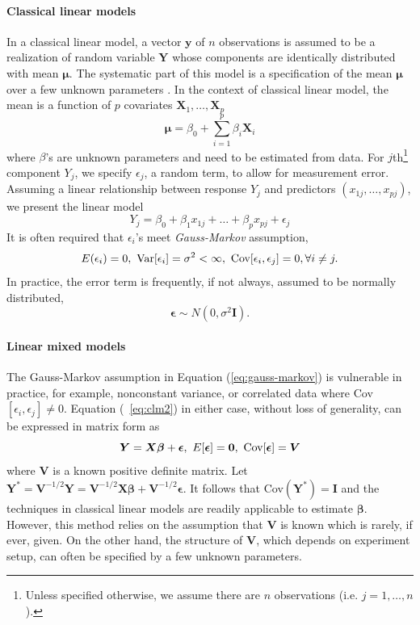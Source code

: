 \paragraph{Classical linear models}\label{para:clm}
In a classical linear model, a vector $\bm y$ of $n$ observations is assumed to be a realization
of random variable $\bm Y$ whose components are identically distributed with mean $\bm \mu$. The
systematic part of this model is a specification of the mean $\bm\mu$ over a few unknown parameters
\citep{mccullagh1989generalized}. In the context of classical linear model, the mean is a function
of $p$ covariates $\bm X_1, \ldots, \bm X_p$
\begin{equation}\label{eq:clm}
\bm \mu =\beta_0 + \sum_{i=1}^p\beta_i \bm X_i
\end{equation}	
where $\beta$'s are unknown parameters and need to be estimated from data. For
$j$th\footnote{Unless specified otherwise, we assume there are $n$ observations (i.e. $j=1, \ldots
	,n$).} component $Y_j$, we specify $\epsilon_j$, a random term, to allow for measurement error.
Assuming a linear relationship between response $Y_j$ and predictors $(x_{1j}, \ldots, x_{pj})$, we
present the linear model 
\begin{equation}\label{eq:clm2}
Y_j= \beta_0 + \beta_1x_{1j} + \ldots + \beta_p x_{pj} + \epsilon_j
\end{equation}
It is often required that $\epsilon_i$'s meet \textit{Gauss-Markov} assumption,
\begin{equation}\label{eq:gauss-markov}
E(\epsilon_i)=0,~ \text{Var}[\epsilon_i]=
\sigma^2<\infty, ~\text{Cov}[\epsilon_i, \epsilon_j]=0, \forall i \neq j.
\end{equation}
In practice, the error term is frequently, if not always, assumed to be normally distributed, 
\begin{equation}\label{eq:normalassumption}
\bm \epsilon \sim N(0, \sigma^2 \bm I).
\end{equation}

\paragraph{Linear mixed models}\label{para:lmm}
The Gauss-Markov assumption in Equation (\ref{eq:gauss-markov}) is vulnerable in practice, for
example, nonconstant variance, or correlated data where Cov$[\epsilon_i, \epsilon_j]\neq 0$.
Equation (~\ref{eq:clm2}) in either case, without loss of generality, can be expressed in matrix
form as
\begin{equation}\label{eq:clm3}
\bm Y = \bm {X\beta} + \bm \epsilon, ~ E[\bm \epsilon] = \bm 0, ~\text{Cov}[\bm\epsilon] = \bm V
\end{equation}
where $\bm V$ is a known positive definite matrix. Let $\bm Y^{\ast} = \bm V^{-1/2}\bm Y = \bm
V^{-1/2}\bm {X\beta} + \bm V^{-1/2}\bm \epsilon$. It follows that Cov$(\bm Y^{\ast})= \bm I$ and the
techniques in classical linear models are readily applicable to estimate $\bm \beta$. However, this
method relies on the assumption that $\bm V$ is known which is rarely, if ever, given. On the other
hand, the structure of $\bm V$, which depends on experiment setup, can often be specified by a few
unknown parameters. 

